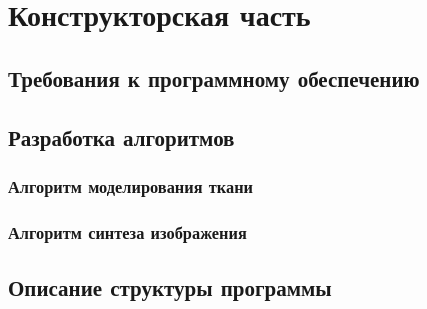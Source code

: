 \chapter{Конструкторская часть}

\section{Требования к программному обеспечению}

\section{Разработка алгоритмов}

\subsection{Алгоритм моделирования ткани}

\subsection{Алгоритм синтеза изображения}

\section{Описание структуры программы}

